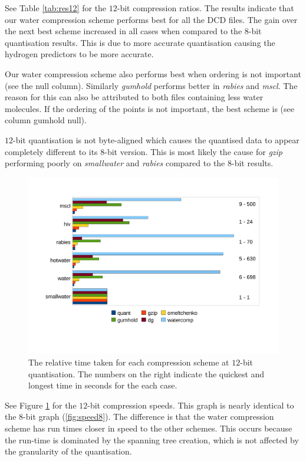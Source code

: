 \documentclass[a4paper]{report}
\begin{document}
See Table \ref{tab:res12} for the $12$-bit compression ratios. The results
indicate that our water compression scheme performs best for all the DCD
files. The gain over the next best scheme increased in all cases when compared
to the $8$-bit quantisation results. This is due to more accurate quantisation
causing the hydrogen predictors to be more accurate.

Our water compression scheme also performs best when ordering is not important
(see the null column). Similarly \emph{gumhold} performs better in
\emph{rabies} and \emph{mscl}. The reason for this can also be attributed to
both files containing less water molecules. If the ordering of the points is
not important, the best scheme is \citet{gumholdcomp} (see column gumhold
null).

$12$-bit quantisation is not byte-aligned which causes the quantised data to
appear completely different to its $8$-bit version. This is most likely the
cause for \emph{gzip} performing poorly on \emph{smallwater} and \emph{rabies}
compared to the $8$-bit results.

\begin{figure}[h]
\centering
\includegraphics[trim = 10mm 25mm 10mm 20mm, clip, width=\textwidth]{images/speed12}
\caption{The relative time taken for each compression scheme at $12$-bit
  quantisation. The numbers on the right indicate the quickest and longest
  time in seconds for the each case.}
\label{fig:speed12}
\end{figure}

See Figure \ref{fig:speed12} for the $12$-bit compression speeds. This graph
is nearly identical to the $8$-bit graph (\ref{fig:speed8}). The difference is
that the water compression scheme has run times closer in speed to the other
schemes. This occurs because the run-time is dominated by the spanning tree
creation, which is not affected by the granularity of the quantisation.
\end{document}
